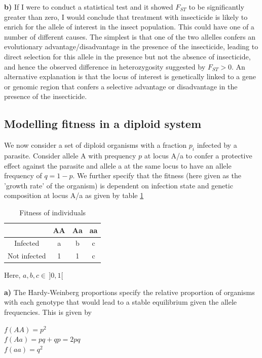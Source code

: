 \documentclass{article}
\begin{document}
\textbf{b)}
If I were to conduct a statistical test and it showed $F_{ST}$ to be significantly greater than zero, I would conclude that treatment with insecticide is likely to enrich for the allele of interest in the insect population. This could have one of a number of different causes. The simplest is that one of the two allelles confers an evolutionary advantage/disadvantage in the presence of the insecticide, leading to direct selection for this allele in the presence but not the absence of insecticide, and hence the observed difference in heterozygosity suggested by $F_{ST} > 0$. An alternative explanation is that the locus of interest is genetically linked to a gene or genomic region that confers a selective advantage or disadvantage in the presence of the insecticide.


\subsection{Modelling fitness in a diploid system}

We now consider a set of diploid organisms with a fraction $p_i$ infected by a parasite. Consider allele A with prequency $p$ at locus A/a to confer a protective effect against the parasite and allele a at the same locus to have an allele frequency of $q = 1-p$. We further specify that the fitness (here given as the 'growth rate' of the organism) is dependent on infection state and genetic composition at locus A/a as given by table \ref{tab:fitness}

\begin{table}[h]
\centering
\begin{tabular}{ |c|c|c|c|}
\hline
 & AA & Aa & aa \\
\hline
Infected & a & b & c \\
Not infected & 1 &1 & c\\
\hline
\end{tabular}
\caption{Fitness of individuals}
\label{tab:fitness}
\end{table}

Here, $a, b, c \in \, ]0, 1[$

\textbf{a)}
The Hardy-Weinberg proportions specify the relative proportion of organisms with each genotype that would lead to a stable equilibrium given the allele frequencies. This is given by

$f(AA) = p^2$\\
$f(Aa) = pq + qp = 2pq$\\
$f(aa) = q^2$\\
\end{document}
